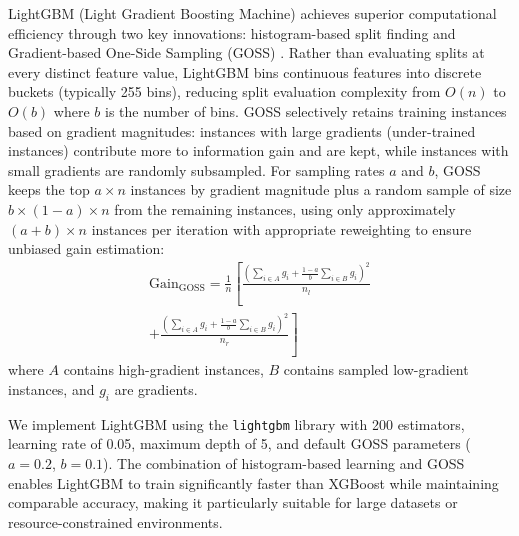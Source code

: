 \documentclass[10pt,twocolumn]{article}
\begin{document}
\par LightGBM (Light Gradient Boosting Machine) achieves superior computational efficiency through two key innovations: histogram-based split finding and Gradient-based One-Side Sampling (GOSS) \cite{ke2017lightgbm}. Rather than evaluating splits at every distinct feature value, LightGBM bins continuous features into discrete buckets (typically 255 bins), reducing split evaluation complexity from $O(n)$ to $O(b)$ where $b$ is the number of bins. GOSS selectively retains training instances based on gradient magnitudes: instances with large gradients (under-trained instances) contribute more to information gain and are kept, while instances with small gradients are randomly subsampled. For sampling rates $a$ and $b$, GOSS keeps the top $a \times n$ instances by gradient magnitude plus a random sample of size $b \times (1-a) \times n$ from the remaining instances, using only approximately $(a+b) \times n$ instances per iteration with appropriate reweighting to ensure unbiased gain estimation:
\begin{multline}
\text{Gain}_{\text{GOSS}} = \frac{1}{n} \left[ \frac{\left(\sum_{i \in A} g_i + \frac{1-a}{b}\sum_{i \in B} g_i\right)^2}{n_l} \right. \\
\left. + \frac{\left(\sum_{i \in A} g_i + \frac{1-a}{b}\sum_{i \in B} g_i\right)^2}{n_r} \right]
\end{multline}
where $A$ contains high-gradient instances, $B$ contains sampled low-gradient instances, and $g_i$ are gradients.
\par We implement LightGBM using the \texttt{lightgbm} library with 200 estimators, learning rate of 0.05, maximum depth of 5, and default GOSS parameters ($a=0.2$, $b=0.1$). The combination of histogram-based learning and GOSS enables LightGBM to train significantly faster than XGBoost while maintaining comparable accuracy, making it particularly suitable for large datasets or resource-constrained environments.
\end{document}
